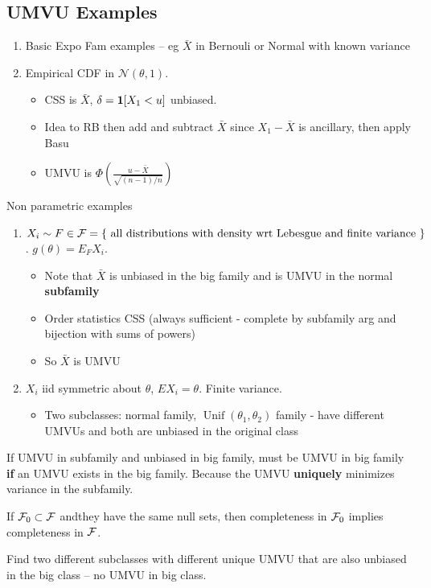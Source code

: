 \documentclass{article}
\newcommand{\Unif}{\operatorname{Unif}}
\begin{document}
\subsection{UMVU Examples}
\begin{enumerate}
	\item Basic Expo Fam examples -- eg $\bar X$ in Bernouli or Normal with known variance 
	\item Empirical CDF in $\mathcal N(\theta,1)$.
	\begin{itemize}
		\item CSS is $\bar X$, $\delta = \boldsymbol{1}[X_1 < u]$ unbiased. 
		\item Idea to RB then add and subtract $\bar X$ since $X_1 - \bar X$ is ancillary, then apply Basu
		\item UMVU is $\Phi(\frac{u - \bar X}{\sqrt{(n-1)/n}})$
	\end{itemize}

\end{enumerate}
Non parametric examples
\begin{enumerate}
	\item $X_i \sim F \in \mathcal F = \{ \text{ all distributions with density wrt Lebesgue and finite variance } \}$. $g(\theta) = E_F X_i$.
	\begin{itemize}
		\item Note that $\bar X$ is unbiased in the big family and is UMVU in the normal \textbf{subfamily} 
		\item Order statistics CSS (always sufficient - complete by subfamily arg and bijection with sums of powers)
		\item So $\bar X$ is UMVU
	\end{itemize}
	\item $X_i$ iid symmetric about $\theta$, $E X_i = \theta$. Finite variance. 
	\begin{itemize}
		\item Two subclasses: normal family, $\Unif(\theta_1, \theta_2)$ family - have different UMVUs and both are unbiased in the original class
	\end{itemize}
\end{enumerate}
\begin{fact}
If UMVU in subfamily and unbiased in big family, must be UMVU in big family \textbf{if} an  UMVU exists in the big family. Because the UMVU \textbf{uniquely} minimizes variance in the subfamily. 
\end{fact}
\begin{fact}
If $\mathcal F_0 \subset \mathcal F$ andthey have the same null sets, then completeness in $\mathcal F_0$ implies completeness in $\mathcal F$. 
\end{fact}
\begin{recipe}
Find two different subclasses with different unique UMVU that are also unbiased in the big class -- no UMVU in big class.	
\end{recipe}
\end{document}
